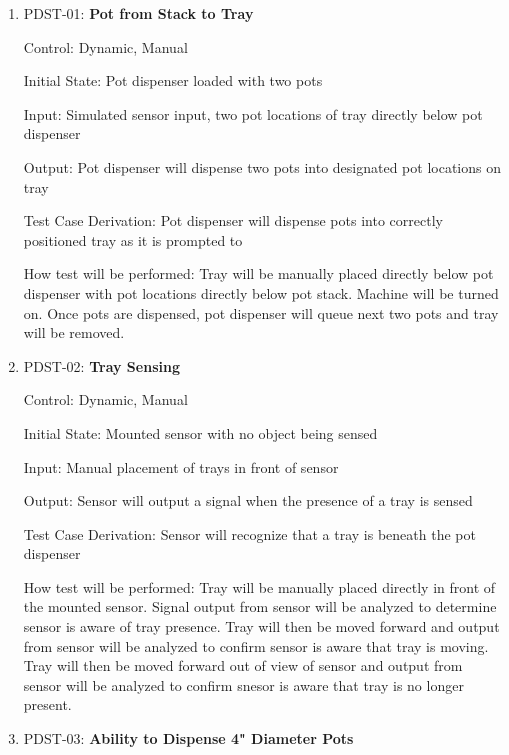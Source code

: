\documentclass[12pt, titlepage]{article}
\begin{document}
\begin{enumerate}
 
  \item{PDST-01: \textbf{Pot from Stack to Tray}\\}
  
  Control: Dynamic, Manual
            
  Initial State: Pot dispenser loaded with two pots
            
  Input: Simulated sensor input, two pot locations of tray directly below pot dispenser
            
  Output: Pot dispenser will dispense two pots into designated pot locations on tray
  
  Test Case Derivation: Pot dispenser will dispense pots into correctly positioned tray as it is prompted to
            
  How test will be performed: Tray will be manually placed directly below pot dispenser with pot locations 
  directly below pot stack. Machine will be turned on. Once pots are dispensed, pot dispenser will 
  queue next two pots and tray will be removed.\\

  \item{PDST-02: \textbf{Tray Sensing}\\}
  
  Control: Dynamic, Manual
            
  Initial State: Mounted sensor with no object being sensed
            
  Input: Manual placement of trays in front of sensor
            
  Output: Sensor will output a signal when the presence of a tray is sensed
  
  Test Case Derivation: Sensor will recognize that a tray is beneath the pot dispenser
            
  How test will be performed: Tray will be manually placed directly in front of the mounted sensor. Signal 
  output from sensor will be analyzed to determine sensor is aware of tray presence. Tray will then be 
  moved forward and output from sensor will be analyzed to confirm sensor is aware that tray is moving. 
  Tray will then be moved forward out of view of sensor and output from sensor will be analyzed to confirm 
  snesor is aware that tray is no longer present.\\

  \item{PDST-03: \textbf{Ability to Dispense 4" Diameter Pots}\\}
  

\end{enumerate}
\end{document}
